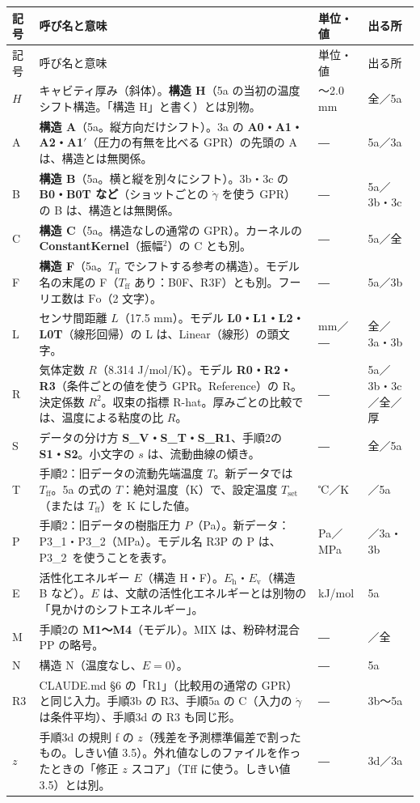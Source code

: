 \documentclass[paper=a4paper,fontsize=10.5pt,line_length=44zw,number_of_lines=38]{jlreq}
\makeatletter
\newcommand{\gd}{\dot{\gamma}}
\newcommand{\Tff}{T_{\mathrm{ff}}}
\newcommand{\Tset}{T_{\mathrm{set}}}
\newcommand{\Eh}{E_{\mathrm{h}}}
\newcommand{\Ev}{E_{\mathrm{v}}}
\newcommand{\PI}{P3\_1}
\newcommand{\PII}{P3\_2}
\newenvironment{symtab}{%
  \begin{longtable}{@{}>{\raggedright\arraybackslash}p{6.5\zw}>{\raggedright\arraybackslash}p{22\zw}>{\raggedright\arraybackslash}p{6\zw}>{\raggedright\arraybackslash}p{4.5\zw}@{}}
  \toprule 記号 & 呼び名と意味 & 単位・値 & 出る所 \\ \midrule \endfirsthead
  \toprule 記号 & 呼び名と意味 & 単位・値 & 出る所 \\ \midrule \endhead
  \bottomrule \endlastfoot}{\end{longtable}}
\makeatother
\begin{document}
\begin{symtab}
$H$ & キャビティ厚み（斜体）。\textbf{構造 H}（5a の当初の温度シフト構造。「構造 H」と書く）とは別物。 & 0.5〜2.0 mm & 全／5a \\
A & \textbf{構造 A}（5a。縦方向だけシフト）。3a の \textbf{A0・A1・A2・A1$'$}（圧力の有無を比べる GPR）の先頭の A は、構造とは無関係。 & ― & 5a／3a \\
B & \textbf{構造 B}（5a。横と縦を別々にシフト）。3b・3c の \textbf{B0・B0T など}（ショットごとの $\gd$ を使う GPR）の B は、構造とは無関係。 & ― & 5a／3b・3c \\
C & \textbf{構造 C}（5a。構造なしの通常の GPR）。カーネルの \textbf{ConstantKernel}（振幅$^2$）の C とも別。 & ― & 5a／全 \\
F & \textbf{構造 F}（5a。$\Tff$ でシフトする参考の構造）。モデル名の末尾の F（$\Tff$ あり：B0F、R3F）とも別。フーリエ数は $\mathrm{Fo}$（2 文字）。 & ― & 5a／3b \\
L & センサ間距離 $L$（17.5 mm）。モデル \textbf{L0・L1・L2・L0T}（線形回帰）の L は、Linear（線形）の頭文字。 & mm／― & 全／3a・3b \\
R & 気体定数 $R$（8.314 J/mol/K）。モデル \textbf{R0・R2・R3}（条件ごとの値を使う GPR。Reference）の R。決定係数 $R^2$。収束の指標 R-hat。厚みごとの比較では、温度による粘度の比 $R$。 & ― & 5a／3b・3c／全／厚 \\
S & データの分け方 \textbf{S\_V・S\_T・S\_R1}、手順2の \textbf{S1・S2}。小文字の $s$ は、流動曲線の傾き。 & ― & 全／5a \\
T & 手順2：旧データの流動先端温度 $T$。新データでは $\Tff$。5a の式の $T$：絶対温度（K）で、設定温度 $\Tset$（または $\Tff$）を K にした値。 & ℃／K & 2／5a \\
P & 手順2：旧データの樹脂圧力 $P$（Pa）。新データ：\PI・\PII（MPa）。モデル名 R3P の P は、\PII\ を使うことを表す。 & Pa／MPa & 2／3a・3b \\
E & 活性化エネルギー $E$（構造 H・F）。$\Eh$・$\Ev$（構造 B など）。$E$ は、文献の活性化エネルギーとは別物の「見かけのシフトエネルギー」。 & kJ/mol & 5a \\
M & 手順2の \textbf{M1〜M4}（モデル）。MIX は、粉砕材混合 PP の略号。 & ― & 2／全 \\
N & 構造 N（温度なし、$E=0$）。 & ― & 5a \\
R3 & CLAUDE.md §6 の「R1」（比較用の通常の GPR）と同じ入力。手順3b の R3、手順5a の C（入力の $\gd$ は条件平均）、手順3d の R3 も同じ形。 & ― & 3b〜5a \\
$z$ & 手順3d の規則 f の $z$（残差を予測標準偏差で割ったもの。しきい値 3.5）。外れ値なしのファイルを作ったときの「修正 $z$ スコア」（Tff に使う。しきい値 3.5）とは別。 & ― & 3d／3a \\

\end{symtab}
\end{document}
